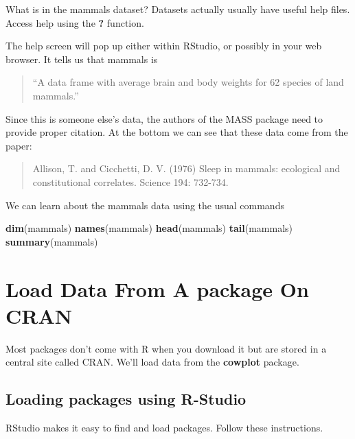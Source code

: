 \documentclass[]{book}
\newenvironment{Shaded}{\begin{snugshade}}{\end{snugshade}}
\newcommand{\KeywordTok}[1]{\textcolor[rgb]{0.13,0.29,0.53}{\textbf{#1}}}
\newcommand{\NormalTok}[1]{#1}
\theoremstyle{definition}
\theoremstyle{definition}
\theoremstyle{definition}
\theoremstyle{remark}
\begin{document}
What is in the mammals dataset? Datasets actually usually have useful
help files. Access help using the \textbf{?} function.

The help screen will pop up either within RStudio, or possibly in your
web browser. It tells us that mammals is

\begin{quote}
``A data frame with average brain and body weights for 62 species of
land mammals.''
\end{quote}

Since this is someone else's data, the authors of the MASS package need
to provide proper citation. At the bottom we can see that these data
come from the paper:

\begin{quote}
Allison, T. and Cicchetti, D. V. (1976) Sleep in mammals: ecological and
constitutional correlates. Science 194: 732-734.
\end{quote}

We can learn about the mammals data using the usual commands

\begin{Shaded}
\begin{Highlighting}[]
\KeywordTok{dim}\NormalTok{(mammals)}
\KeywordTok{names}\NormalTok{(mammals)}
\KeywordTok{head}\NormalTok{(mammals)}
\KeywordTok{tail}\NormalTok{(mammals)}
\KeywordTok{summary}\NormalTok{(mammals)}
\end{Highlighting}
\end{Shaded}

\section{Load Data From A package On
CRAN}\label{load-data-from-a-package-on-cran}

Most packages don't come with R when you download it but are stored in a
central site called CRAN. We'll load data from the \textbf{cowplot}
package.

\subsection{Loading packages using
R-Studio}\label{loading-packages-using-r-studio}

RStudio makes it easy to find and load packages. Follow these
instructions.
\end{document}
